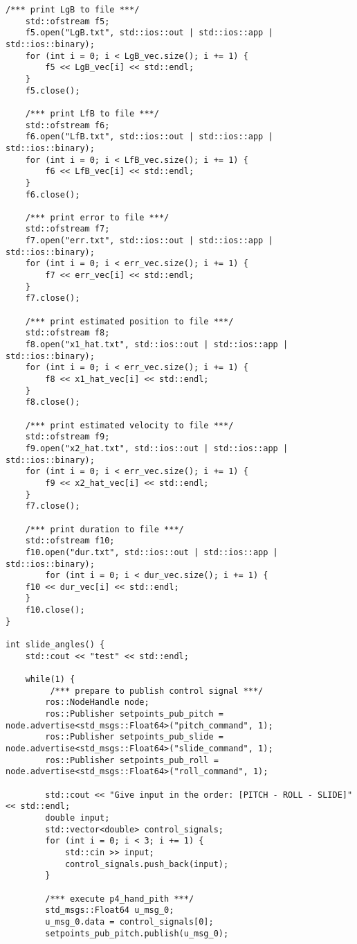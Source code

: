 \begin{lstlisting}[language=gedit]
    /*** print LgB to file ***/
    std::ofstream f5;
    f5.open("LgB.txt", std::ios::out | std::ios::app | std::ios::binary);
    for (int i = 0; i < LgB_vec.size(); i += 1) {
        f5 << LgB_vec[i] << std::endl;
    }
    f5.close();

    /*** print LfB to file ***/
    std::ofstream f6;
    f6.open("LfB.txt", std::ios::out | std::ios::app | std::ios::binary);
    for (int i = 0; i < LfB_vec.size(); i += 1) {
        f6 << LfB_vec[i] << std::endl;
    }
    f6.close();

    /*** print error to file ***/
    std::ofstream f7;
    f7.open("err.txt", std::ios::out | std::ios::app | std::ios::binary);
    for (int i = 0; i < err_vec.size(); i += 1) {
        f7 << err_vec[i] << std::endl;
    }
    f7.close();

    /*** print estimated position to file ***/
    std::ofstream f8;
    f8.open("x1_hat.txt", std::ios::out | std::ios::app | std::ios::binary);
    for (int i = 0; i < err_vec.size(); i += 1) {
        f8 << x1_hat_vec[i] << std::endl;
    }
    f8.close();

    /*** print estimated velocity to file ***/
    std::ofstream f9;
    f9.open("x2_hat.txt", std::ios::out | std::ios::app | std::ios::binary);
    for (int i = 0; i < err_vec.size(); i += 1) {
        f9 << x2_hat_vec[i] << std::endl;
    }
    f7.close();

    /*** print duration to file ***/
    std::ofstream f10;
    f10.open("dur.txt", std::ios::out | std::ios::app | std::ios::binary);
        for (int i = 0; i < dur_vec.size(); i += 1) {
    f10 << dur_vec[i] << std::endl;
    }
    f10.close();
}

int slide_angles() {
    std::cout << "test" << std::endl;
 
    while(1) {
         /*** prepare to publish control signal ***/ 
        ros::NodeHandle node;
        ros::Publisher setpoints_pub_pitch = node.advertise<std_msgs::Float64>("pitch_command", 1);
        ros::Publisher setpoints_pub_slide = node.advertise<std_msgs::Float64>("slide_command", 1);
        ros::Publisher setpoints_pub_roll = node.advertise<std_msgs::Float64>("roll_command", 1);

        std::cout << "Give input in the order: [PITCH - ROLL - SLIDE]" << std::endl;
        double input;
        std::vector<double> control_signals;
        for (int i = 0; i < 3; i += 1) {
            std::cin >> input;
            control_signals.push_back(input);
        }
   
        /*** execute p4_hand_pith ***/
        std_msgs::Float64 u_msg_0;
        u_msg_0.data = control_signals[0];
        setpoints_pub_pitch.publish(u_msg_0);


\end{lstlisting}
